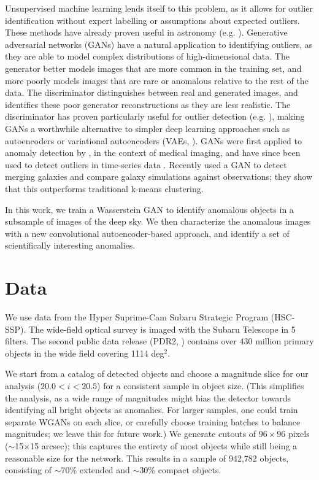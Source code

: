 \documentclass{article}
\begin{document}
Unsupervised machine learning lends itself to this problem, as it allows for outlier identification without expert labelling or assumptions about expected outliers.
These methods have already proven useful in astronomy (e.g. \citealt{Baron2017,Solarz2017,Giles2019,Ishida2019,Pruzhinskaya2019,Lochner2020}).
Generative adversarial networks (GANs) have a natural application to identifying outliers, as they are able to model complex distributions of high-dimensional data.
The generator better models images that are more common in the training set, and more poorly models images that are rare or anomalous relative to the rest of the data.
The discriminator distinguishes between real and generated images, and identifies these poor generator reconstructions as they are less realistic.
The discriminator has proven particularly useful for outlier detection (e.g. \citealt{Son2019}), making GANs a worthwhile alternative to simpler deep learning approaches such as autoencoders or variational autoencoders (VAEs, \citealt{Kingma2014}). 
GANs were first applied to anomaly detection by \cite{Schlegl2017}, in the context of medical imaging, and have since been used to detect outliers in time-series data \citep{Li2018}.
Recently \cite{Margalef-Bentabol2020} used a GAN to detect merging galaxies and compare galaxy simulations against observations; they show that this outperforms traditional k-means clustering.

In this work, we train a Wasserstein GAN to identify anomalous objects in a subsample of images of the deep sky.
We then characterize the anomalous images with a new convolutional autoencoder-based approach, and identify a set of scientifically interesting anomalies.


\section{Data}

We use data from the Hyper Suprime-Cam Subaru Strategic Program (HSC-SSP).
The wide-field optical survey is imaged with the Subaru Telescope in 5 filters.
The second public data release (PDR2, \citealt{Aihara2014}) contains over 430 million primary objects in the wide field covering 1114 deg$^2$.

We start from a catalog of detected objects and choose a magnitude slice for our analysis ($20.0<i<20.5$) for a consistent sample in object size.
(This simplifies the analysis, as a wide range of magnitudes might bias the detector towards identifying all bright objects as anomalies.
For larger samples, one could train separate WGANs on each slice, or carefully choose training batches to balance magnitudes; we leave this for future work.)
We generate cutouts of $96 \times 96$ pixels ($\sim$15$\times$15 arcsec); this captures the entirety of most objects while still being a reasonable size for the network.
This results in a sample of 942,782 objects, consisting of $\sim$70\% extended and $\sim$30\% compact objects.
\end{document}
